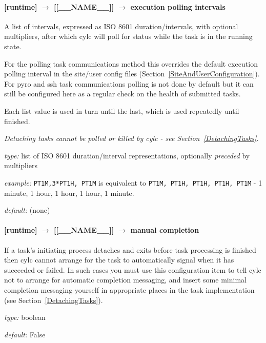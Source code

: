 \paragraph[execution polling intervals]{[runtime] $\rightarrow$ [[\_\_NAME\_\_]] $\rightarrow$ execution polling intervals}
\label{ExecutionPollingIntervals}

A list of intervals, expressed as ISO 8601 duration/intervals, with optional
multipliers, after which cylc will poll for status while the task is in the
running state.

For the polling task communications method this overrides the default
execution polling interval in the site/user config files
(Section~\ref{SiteAndUserConfiguration}). For pyro and ssh task communications
polling is not done by default but it can still be configured here as a
regular check on the health of submitted tasks.

Each list value is used in turn until the last, which is used repeatedly
until finished.

{\em Detaching tasks cannot be polled or killed by cylc -
see Section~\ref{DetachingTasks}.}

\begin{myitemize}
    \item {\em type:} list of ISO 8601 duration/interval representations,
    optionally {\em preceded} by multipliers
    \item {\em example:} \lstinline=PT1M,3*PT1H, PT1M= is equivalent to
    \lstinline=PT1M, PT1H, PT1H, PT1H, PT1M= - 1 minute, 1 hour, 1 hour, 1
    hour, 1 minute.
    \item {\em default:} (none)
\end{myitemize}

\paragraph[manual completion]{ [runtime] $\rightarrow$ [[\_\_NAME\_\_]] $\rightarrow$ manual completion}

If a task's initiating process detaches and exits before task processing
is finished then cylc cannot arrange for the task to automatically
signal when it has succeeded or failed. In such cases you must use this
configuration item to tell cylc not to arrange for automatic completion
messaging, and insert some minimal completion messaging yourself in
appropriate places in the task implementation (see
Section~\ref{DetachingTasks}).

\begin{myitemize}
\item {\em type:} boolean
\item {\em default:} False
\end{myitemize}

